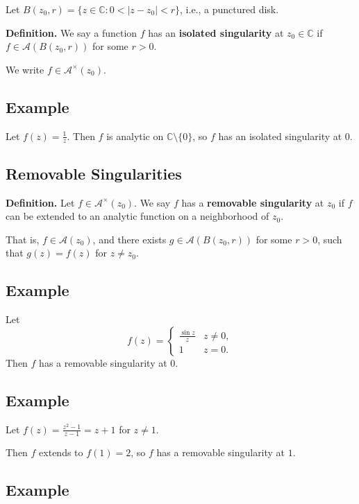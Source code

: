 \documentclass[12pt]{article}
\theoremstyle{definition} %
\theoremstyle{plain} %
\begin{document}
Let $B(z_0, r) = \{ z \in \mathbb{C} : 0 < |z - z_0| < r \}$, i.e., a punctured disk.

\textbf{Definition.} We say a function $f$ has an \textbf{isolated singularity} at $z_0 \in \mathbb{C}$ if $f \in \mathcal{A}(B(z_0, r))$ for some $r > 0$.

We write $f \in \mathcal{A}^\times(z_0)$.

\subsection*{Example}

Let $f(z) = \frac{1}{z}$. Then $f$ is analytic on $\mathbb{C} \setminus \{0\}$, so $f$ has an isolated singularity at $0$.

\subsection*{Removable Singularities}

\textbf{Definition.} Let $f \in \mathcal{A}^\times(z_0)$. We say $f$ has a \textbf{removable singularity} at $z_0$ if $f$ can be extended to an analytic function on a neighborhood of $z_0$.

That is, $f \in \mathcal{A}(z_0)$, and there exists $g \in \mathcal{A}(B(z_0, r))$ for some $r > 0$, such that $g(z) = f(z)$ for $z \neq z_0$.

\subsection*{Example}

Let
\[
f(z) = 
\begin{cases}
\frac{\sin z}{z} & z \neq 0, \\
1 & z = 0.
\end{cases}
\]
Then $f$ has a removable singularity at $0$.

\subsection*{Example}

Let $f(z) = \frac{z^2 - 1}{z - 1} = z + 1$ for $z \neq 1$.

Then $f$ extends to $f(1) = 2$, so $f$ has a removable singularity at $1$.

\subsection*{Example}
\end{document}

